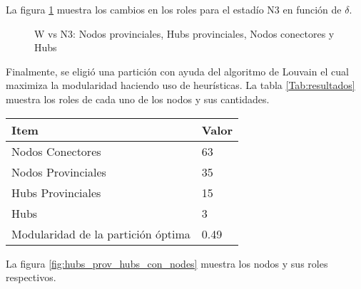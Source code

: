 \documentclass{article}
\begin{document}
La figura \ref{fig:n3_rol_cambios} muestra los cambios en los roles para el estadío N3 en función de $\delta$.

\begin{figure}[H]
    \centering
    \hfill
    \hfill
    \hfill
    \hfill
    \caption[]{W vs N3: Nodos provinciales, Hubs provinciales, Nodos conectores y Hubs\footnotemark}
    \label{fig:n3_rol_cambios}
\end{figure}

Finalmente, se eligió una partición con ayuda del algoritmo de Louvain el cual maximiza la modularidad haciendo uso de heurísticas\cite{SciPyProceedings_11}. La tabla \ref{Tab:resultados} muestra los roles de cada uno de los nodos y sus cantidades.

\begin{table}[H]
\begin{tabular}{ll}
\hline
\textbf{Item}                                               & \textbf{Valor}                \\ \hline
\multicolumn{1}{|l|}{Nodos Conectores}                      & \multicolumn{1}{l|}{63}       \\ \hline
\multicolumn{1}{|l|}{Nodos Provinciales}                    & \multicolumn{1}{l|}{35}       \\ \hline
\multicolumn{1}{|l|}{Hubs Provinciales}                     & \multicolumn{1}{l|}{15}       \\ \hline
\multicolumn{1}{|l|}{Hubs}                                  & \multicolumn{1}{l|}{3}        \\ \hline
\multicolumn{1}{|l|}{Modularidad de la partición óptima}    & \multicolumn{1}{l|}{0.49}     \\ \hline
\end{tabular}
\end{table}

La figura \ref{fig:hubs_prov_hubs_con_nodes} muestra los nodos y sus roles respectivos.
\end{document}
